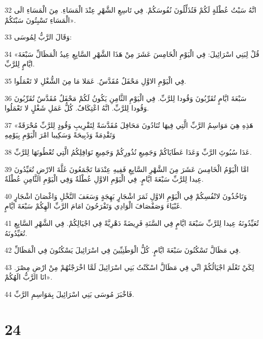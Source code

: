 \par 32 انَّهُ سَبْتُ عُطْلَةٍ لَكُمْ فَتُذَلِّلُونَ نُفُوسَكُمْ. فِي تَاسِعِ الشَّهْرِ عِنْدَ الْمَسَاءِ. مِنَ الْمَسَاءِ الَى الْمَسَاءِ تَسْبِتُونَ سَبْتَكُمْ».
\par 33 وَقَالَ الرَّبُّ لِمُوسَى:
\par 34 «قُلْ لِبَنِي اسْرَائِيلَ: فِي الْيَوْمِ الْخَامِسَ عَشَرَ مِنْ هَذَا الشَّهْرِ السَّابِعِ عِيدُ الْمَظَالِّ سَبْعَةَ ايَّامٍ لِلرَّبِّ.
\par 35 فِي الْيَوْمِ الاوَّلِ مَحْفَلٌ مُقَدَّسٌ. عَمَلا مَا مِنَ الشُّغْلِ لا تَعْمَلُوا.
\par 36 سَبْعَةَ ايَّامٍ تُقَرِّبُونَ وَقُودا لِلرَّبِّ. فِي الْيَوْمِ الثَّامِنِ يَكُونُ لَكُمْ مَحْفَلٌ مُقَدَّسٌ تُقَرِّبُونَ وَقُودا لِلرَّبِّ. انَّهُ اعْتِكَافٌ. كُلُّ عَمَلِ شَغْلٍ لا تَعْمَلُوا.
\par 37 «هَذِهِ هِيَ مَوَاسِمُ الرَّبِّ الَّتِي فِيهَا تُنَادُونَ مَحَافِلَ مُقَدَّسَةً لِتَقْرِيبِ وَقُودٍ لِلرَّبِّ مُحْرَقَةً وَتَقْدِمَةً وَذَبِيحَةً وَسَكِيبا امْرَ الْيَوْمِ بِيَوْمِهِ
\par 38 عَدَا سُبُوتَِ الرَّبِّ وَعَدَا عَطَايَاكُمْ وَجَمِيعِ نُذُورِكُمْ وَجَمِيعِ نَوَافِلِكُمُ الَّتِي تُعْطُونَهَا لِلرَّبِّ.
\par 39 امَّا الْيَوْمُ الْخَامِسَ عَشَرَ مِنَ الشَّهْرِ السَّابِعِ فَفِيهِ عِنْدَمَا تَجْمَعُونَ غَلَّةَ الارْضِ تُعَيِّدُونَ عِيدا لِلرَّبِّ سَبْعَةَ ايَّامٍ. فِي الْيَوْمِ الاوَّلِ عُطْلَةٌ وَفِي الْيَوْمِ الثَّامِنِ عُطْلَةٌ.
\par 40 وَتَاخُذُونَ لانْفُسِكُمْ فِي الْيَوْمِ الاوَّلِ ثَمَرَ اشْجَارٍ بَهِجَةٍ وَسَعَفَ النَّخْلِ وَاغْصَانَ اشْجَارٍ غَبْيَاءَ وَصَفْصَافَ الْوَادِي وَتَفْرَحُونَ امَامَ الرَّبِّ الَهِكُمْ سَبْعَةَ ايَّامٍ.
\par 41 تُعَيِّدُونَهُ عِيدا لِلرَّبِّ سَبْعَةَ ايَّامٍ فِي السَّنَةِ فَرِيضَةً دَهْرِيَّةً فِي اجْيَالِكُمْ. فِي الشَّهْرِ السَّابِعِ تُعَيِّدُونَهُ.
\par 42 فِي مَظَالَّ تَسْكُنُونَ سَبْعَةَ ايَّامٍ. كُلُّ الْوَطَنِيِّينَ فِي اسْرَائِيلَ يَسْكُنُونَ فِي الْمَظَالِّ.
\par 43 لِكَيْ تَعْلَمَ اجْيَالُكُمْ انِّي فِي مَظَالَّ اسْكَنْتُ بَنِي اسْرَائِيلَ لَمَّا اخْرَجْتُهُمْ مِنْ ارْضِ مِصْرَ. انَا الرَّبُّ الَهُكُمْ».
\par 44 فَاخْبَرَ مُوسَى بَنِي اسْرَائِيلَ بِمَوَاسِمِ الرَّبِّ.

\chapter{24}

